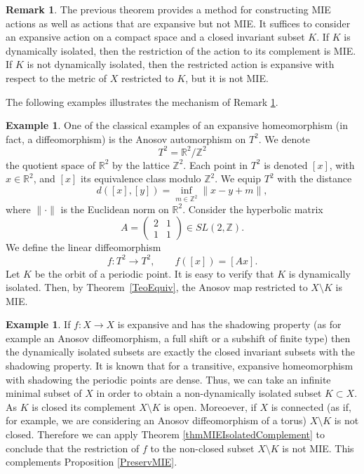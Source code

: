 \documentclass[12pt]{amsart}
\newcommand{\R}{\mathbb R}
\newcommand{\Z}{\mathbb Z}
\theoremstyle{plain}
\theoremstyle{definition}
\newtheorem{remark}[theorem]{Remark}
\newtheorem{example}[theorem]{Example}
\theoremstyle{remark}
\begin{document}
\begin{remark}
\label{rmkMechMIE}
The previous theorem provides a method for constructing MIE actions as well as actions that are expansive but not MIE. It suffices to consider an expansive action on a compact space and a closed invariant subset \(K\). If \(K\) is dynamically isolated, then the restriction of the action to its complement is MIE.
If \(K\) is not dynamically isolated, then the restricted action is expansive with respect to the metric of $X$ restricted to $K$, but it is not MIE.
\end{remark}

The following examples illustrates the mechanism of Remark \ref{rmkMechMIE}.

\begin{example}
\label{Anosov}
One of the classical examples of an expansive homeomorphism (in fact, a diffeomorphism) is the Anosov automorphism on \(T^2\).
We denote 
\[
  T^2 = \R^2 / \Z^2
\]
the quotient space of \(\R^2\) by the lattice \(\Z^2\). Each point in \(T^2\) is denoted \([x]\), with \(x \in \R^2\), and \([x]\) its equivalence class modulo \(\Z^2\). We equip \(T^2\) with the distance
\[
  d([x],[y]) = \inf_{m \in \Z^2} \| x - y + m \|,
\]
where \(\| \cdot \|\) is the Euclidean norm on \(\R^2\).
Consider the hyperbolic matrix
\[
  A = \begin{pmatrix} 2 & 1 \\ 1 & 1 \end{pmatrix} \in SL(2,\Z).
\]
We define the linear diffeomorphism
\[
  f : T^2 \to T^2, 
  \qquad 
  f([x]) = [A x].
\]
Let \( K \) be the orbit of a periodic point. It is easy to verify that \( K \) is dynamically isolated. Then, by Theorem~\ref{TeoEquiv}, the Anosov map restricted to \( X \setminus K \) is MIE.
\end{example}

\begin{example}
\label{exaRestNoMie}
If $f\colon X\to X$ is expansive and has the shadowing property (as for example an Anosov diffeomorphism, a full shift or a subshift of finite type) then the dynamically isolated subsets are exactly the closed invariant subsets with the shadowing property. It is known that for a transitive, expansive homeomorphism with shadowing the periodic points are dense.
Thus, we can take an infinite minimal subset of $X$ in order to obtain a non-dynamically isolated subset $K\subset X$. As $K$ is closed its complement $X\setminus K$ is open.
Moreoever, if $X$ is connected (as if, for example, we are considering an Anosov diffeomorphism of a torus) $X\setminus K$ is not closed.
Therefore we can apply Theorem \ref{thmMIEIsolatedComplement}
to conclude that the restriction of $f$ to the non-closed subset $X\setminus K$ is not MIE. This complements Proposition \ref{PreservMIE}.
\end{example}
\end{document}
